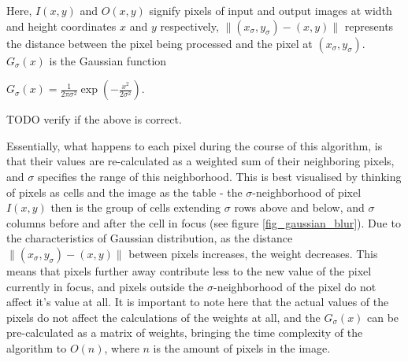 \documentclass [12pt,a4paper]{report}
\begin{document}
Here, $I(x,y)$ and $O(x,y)$ signify pixels of input and output images at width and height coordinates $x$ and $y$ respectively, $\| (x_\sigma, y_\sigma)-(x, y) \|$ represents the distance between the pixel being processed and the pixel at $(x_\sigma, y_\sigma)$. $G_\sigma(x)$ is the Gaussian function

\begin{center}
$G_\sigma(x) = \frac{1}{2\pi\sigma^2} \exp(-\frac{x^2}{2\sigma^2})$.
\end{center}

TODO verify if the above is correct.

Essentially, what happens to each pixel during the course of this algorithm, is that their values are re-calculated as a weighted sum of their neighboring pixels, and $\sigma$ specifies the range of this neighborhood. This is best visualised by thinking of pixels as cells and the image as the table - the $\sigma$-neighborhood of pixel $I(x,y)$ then is the group of cells extending $\sigma$ rows above and below, and $\sigma$ columns before and after the cell in focus (see figure \ref{fig_gaussian_blur}). Due to the characteristics of Gaussian distribution, as the distance $\| (x_\sigma, y_\sigma)-(x, y) \|$ between pixels increases, the weight decreases. This means that pixels further away contribute less to the new value of the pixel currently in focus, and pixels outside the $\sigma$-neighborhood of the pixel do not affect it's value at all. It is important to note here that the actual values of the pixels do not affect the calculations of the weights at all, and the $G_\sigma(x)$ can be pre-calculated as a matrix of weights, bringing the time complexity of the algorithm to $O(n)$, where $n$ is the amount of pixels in the image.
\end{document}
